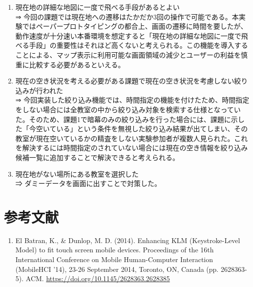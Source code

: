 \documentclass[12pt,a4paper,dvipdf]{jsarticle}
\begin{document}
\begin{enumerate}
    \item 現在地の詳細な地図に一度で飛べる手段があるとよい\\
          ⇒ 今回の課題では現在地への遷移はたかだか3回の操作で可能である。本実験ではペーパープロトタイピングの都合上、画面の遷移に時間を要したが、動作速度が十分速い本番環境を想定すると「現在地の詳細な地図に一度で飛べる手段」の重要性はそれほど高くないと考えられる。この機能を導入することによる、マップ表示に利用可能な画面領域の減少とユーザーの利益を慎重に比較する必要があるといえる。
    \item 現在の空き状況を考える必要がある課題で現在の空き状況を考慮しない絞り込みが行われた\\
          ⇒ 今回実装した絞り込み機能では、時間指定の機能を付けたため、時間指定をしない場合には全教室の中から絞り込み対象を検索する仕様となっていた。そのため、課題1で暗幕のみの絞り込みを行った場合には、課題に示した「今空いている」という条件を無視した絞り込み結果が出てしまい、その教室が現在空いているかの精査をしない実験参加者が複数人見られた。これを解決するには時間指定のされていない場合には現在の空き情報を絞り込み候補一覧に追加することで解決できると考えられる。
    \item 現在地がない場所にある教室を選択した\\
          ⇒ ダミーデータを画面に出すことで対策した。
\end{enumerate}
\section{参考文献}
\begin{enumerate}
    \item El Batran, K., \& Dunlop, M. D. (2014). Enhancing KLM (Keystroke-Level Model) to fit touch screen mobile devices. Proceedings of the 16th International Conference on Mobile Human-Computer Interaction (MobileHCI '14), 23-26 September 2014, Toronto, ON, Canada (pp. 2628363-5). ACM. \url{https://doi.org/10.1145/2628363.2628385}
\end{enumerate}
\end{document}
